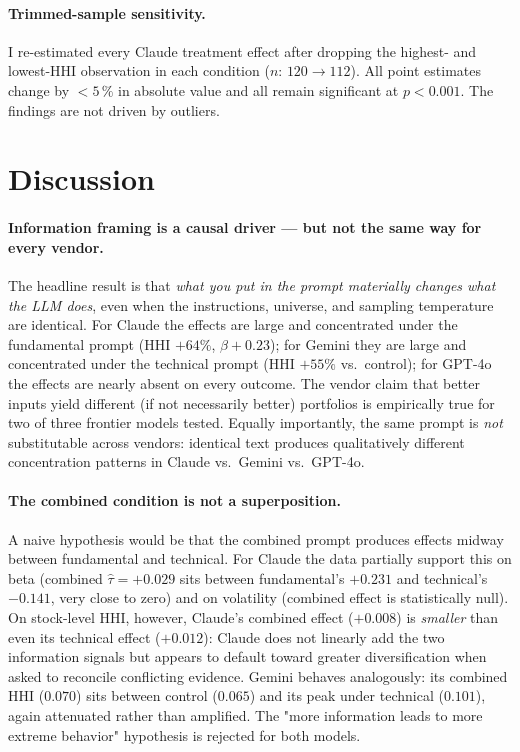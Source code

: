 \documentclass[11pt]{article}
\begin{document}
\paragraph{Trimmed-sample sensitivity.} I re-estimated every Claude
treatment effect after dropping the highest- and lowest-HHI
observation in each condition ($n$: $120 \to 112$). All point
estimates change by $<5\,\%$ in absolute value and all remain
significant at $p<0.001$. The findings are not driven by outliers.

\section{Discussion}

\paragraph{Information framing is a causal driver --- but not the same way for every vendor.}
The headline result is that \emph{what you put in the prompt materially
changes what the LLM does}, even when the instructions, universe, and
sampling temperature are identical. For Claude the effects are large
and concentrated under the fundamental prompt (HHI $+64\%$, $\beta
+0.23$); for Gemini they are large and concentrated under the technical
prompt (HHI $+55\%$ vs.\ control); for GPT-4o the effects are nearly
absent on every outcome. The vendor claim that better inputs yield
different (if not necessarily better) portfolios is empirically true
for two of three frontier models tested. Equally importantly, the same
prompt is \emph{not} substitutable across vendors: identical text
produces qualitatively different concentration patterns in Claude vs.\
Gemini vs.\ GPT-4o.

\paragraph{The combined condition is not a superposition.}
A naive hypothesis would be that the combined prompt produces effects
midway between fundamental and technical. For Claude the data
partially support this on beta (combined $\hat\tau = +0.029$ sits
between fundamental's $+0.231$ and technical's $-0.141$, very close to
zero) and on volatility (combined effect is statistically null). On
stock-level HHI, however, Claude's combined effect ($+0.008$) is
\emph{smaller} than even its technical effect ($+0.012$): Claude does
not linearly add the two information signals but appears to default
toward greater diversification when asked to reconcile conflicting
evidence. Gemini behaves analogously: its combined HHI ($0.070$) sits
between control ($0.065$) and its peak under technical ($0.101$), again
attenuated rather than amplified. The "more information leads to more
extreme behavior" hypothesis is rejected for both models.
\end{document}
